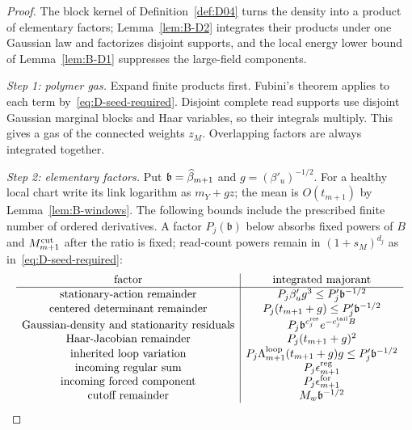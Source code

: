 \begin{proof}
The block kernel of Definition~\ref{def:D04} turns the density into a product of elementary factors; Lemma~\ref{lem:B-D2} integrates their products under one Gaussian law and factorizes disjoint supports, and the local energy lower bound of Lemma~\ref{lem:B-D1} suppresses the large-field components.

\emph{Step 1: polymer gas.} Expand finite products first. Fubini's theorem applies to each term by~\eqref{eq:D-seed-required}. Disjoint complete read supports use disjoint Gaussian marginal blocks and Haar variables, so their integrals multiply. This gives a gas of the connected weights $z_M$. Overlapping factors are always integrated together.

\emph{Step 2: elementary factors.} Put $\mathfrak b=\widehat{\beta}_{m+1}$ and $g=(\beta'_u)^{-1/2}$. For a healthy local chart write its link logarithm as $m_Y+gz$; the mean is $O(t_{m+1})$ by Lemma~\ref{lem:B-windows}. The following bounds include the prescribed finite number of ordered derivatives. A factor $P_j(\mathfrak b)$ below absorbs fixed powers of $B$ and $M^{\mathrm{cut}}_{m+1}$ after the ratio is fixed; read-count powers remain in $(1+s_M)^{d_j}$ as in~\eqref{eq:D-seed-required}:
\begin{equation}\label{eq:D-factor-rates}
\begin{array}{c|c}
\text{factor}&\text{integrated majorant}\\\hline
\text{stationary-action remainder}&P_j\beta'_u g^3\le P'_j\mathfrak b^{-1/2}\\
\text{centered determinant remainder}&P_j(t_{m+1}+g)\le P'_j\mathfrak b^{-1/2}\\
\text{Gaussian-density and stationarity residuals}&P_j\mathfrak b^{c_j^{\rm res}}e^{-c_j^{\rm tail}B}\\
\text{Haar-Jacobian remainder}&P_j(t_{m+1}+g)^2\\
\text{inherited loop variation}&P_j\Lambda_{m+1}^{\rm loop}(t_{m+1}+g)g\le P'_j\mathfrak b^{-1/2}\\
\text{incoming regular sum}&P_j\epsilon_{m+1}^{\rm reg}\\
\text{incoming forced component}&P_j\epsilon_{m+1}^{\rm for}\\
\text{cutoff remainder}&M_w\mathfrak b^{-1/2}
\end{array}
\end{equation}

\end{proof}
